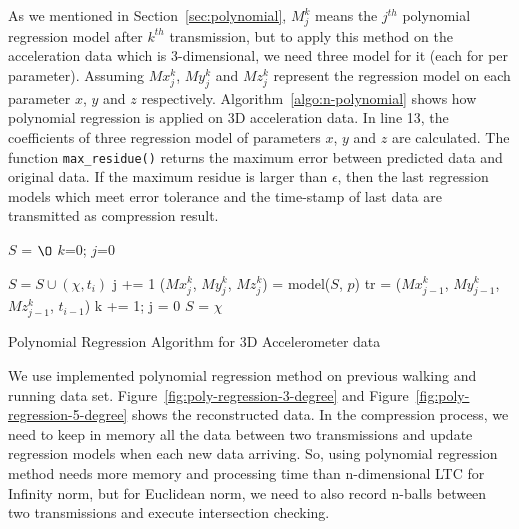 As we mentioned in Section~\ref{sec:polynomial}, $M_{j}^{k}$ means the $j^{th}$
polynomial regression model after $k^{th}$ transmission, but to apply this
method on the acceleration data which is 3-dimensional, we need three model for
it (each for per parameter). Assuming $Mx_{j}^{k}$, $My_{j}^{k}$ and
$Mz_{j}^{k}$ represent the regression model on each parameter $x$, $y$ and $z$
respectively. Algorithm~\ref{algo:n-polynomial} shows how polynomial regression
is applied on 3D acceleration data. In line 13, the coefficients of three
regression model of parameters $x$, $y$ and $z$ are calculated. The function
\texttt{max\_residue()} returns the maximum error between predicted data and
original data. If the maximum residue is larger than $\epsilon$, then the last
regression models which meet error tolerance and the time-stamp of last data are
transmitted as compression result.
\begin{algorithm}
\begin{algorithmic}[1]
\Input
\EndInput
\Output
\EndOutput
\State $S$ = $\O$
\State $k$=0; $j$=0

    \State $S = S \cup (\chi, t_i)$
        \State j += 1
        \State ($Mx_{j}^{k}$, $My_{j}^{k}$, $Mz_{j}^{k}$) = model($S$, $p$)    
            \State tr = ($Mx_{j-1}^{k}$, $My_{j-1}^{k}$, $Mz_{j-1}^{k}$, $t_{i-1}$)
            \State k += 1; j = 0
            \State $S$ = $\chi$
        \EndIf
    \EndIf
\EndWhile

\end{algorithmic}
\caption{Polynomial Regression Algorithm for 3D Accelerometer data}
\label{algo:n-polynomial}
\end{algorithm}

We use implemented polynomial regression method on previous walking and running
data set. Figure~\ref{fig:poly-regression-3-degree} and
Figure~\ref{fig:poly-regression-5-degree} shows the reconstructed data. In the
compression process, we need to keep in memory all the data between two
transmissions and update regression models when each new data arriving. So,
using polynomial regression method needs more memory and processing time than
n-dimensional LTC for Infinity norm, but for Euclidean norm, we need to also
record n-balls between two transmissions and execute intersection checking. 

